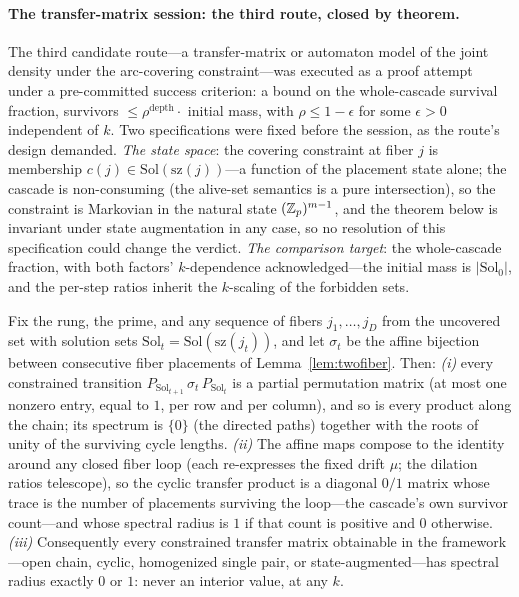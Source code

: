 \paragraph{The transfer-matrix session: the third route, closed by
theorem.}
The third candidate route---a transfer-matrix or automaton model of the
joint density under the arc-covering constraint---was executed as a
proof attempt under a pre-committed success criterion: a bound on the
whole-cascade survival fraction, survivors $\le\rho^{\mathrm{depth}}
\cdot$ initial mass, with $\rho\le 1-\epsilon$ for some $\epsilon>0$
independent of $k$. Two specifications were fixed before the session,
as the route's design demanded. \emph{The state space}: the covering
constraint at fiber $j$ is membership
$c(j)\in\mathrm{Sol}(\mathrm{sz}(j))$---a function of the placement
state alone; the cascade is non-consuming (the alive-set semantics is
a pure intersection), so the constraint is Markovian in the natural
state $(\mathbb{Z}_p)^{m-1}$, and the theorem below is invariant under state
augmentation in any case, so no resolution of this specification could
change the verdict. \emph{The comparison target}: the whole-cascade
fraction, with both factors' $k$-dependence acknowledged---the initial
mass is $|\mathrm{Sol}_0|$, and the per-step ratios inherit the
$k$-scaling of the forbidden sets.

\begin{lemma}\label{lem:monomial}
Fix the rung, the prime, and any sequence of fibers $j_1,\dots,j_D$
from the uncovered set with solution sets
$\mathrm{Sol}_t=\mathrm{Sol}(\mathrm{sz}(j_t))$, and let $\sigma_t$
be the affine bijection between consecutive fiber placements of
Lemma~\ref{lem:twofiber}. Then: \emph{(i)} every constrained
transition $P_{\mathrm{Sol}_{t+1}}\,\sigma_t\,P_{\mathrm{Sol}_t}$ is
a partial permutation matrix (at most one nonzero entry, equal to $1$,
per row and per column), and so is every product along the chain; its
spectrum is $\{0\}$ (the directed paths) together with the roots of
unity of the surviving cycle lengths. \emph{(ii)} The affine maps
compose to the identity around any closed fiber loop (each re-expresses
the fixed drift $\mu$; the dilation ratios telescope), so the cyclic
transfer product is a diagonal $0/1$ matrix whose trace is the number
of placements surviving the loop---the cascade's own survivor
count---and whose spectral radius is $1$ if that count is positive and
$0$ otherwise. \emph{(iii)} Consequently every constrained transfer
matrix obtainable in the framework---open chain, cyclic, homogenized
single pair, or state-augmented---has spectral radius exactly $0$ or
$1$: never an interior value, at any $k$.
\end{lemma}

